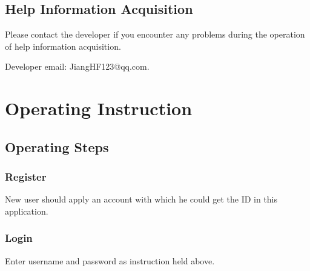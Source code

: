 \documentclass[10pt]{article}
\begin{document}
\subsection{Help Information Acquisition}
Please contact the developer if you encounter any problems during the operation of help information acquisition.

Developer email: JiangHF123@qq.com.

\section{Operating Instruction}
\subsection{Operating Steps}
\subsubsection{Register}
New user should apply an account with which he could get the ID in this application.

\subsubsection{Login}
Enter username and password as instruction held above.
\end{document}
